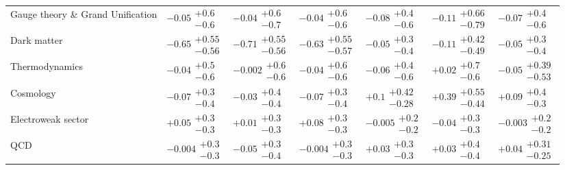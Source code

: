 \begin{table}[H]
\begin{tabular}{lllllll}
Gauge theory \& Grand Unification & $-0.05\substack{+0.6 \\ -0.6}$ & $-0.04\substack{+0.6 \\ -0.7}$ & $-0.04\substack{+0.6 \\ -0.6}$ & $-0.08\substack{+0.4 \\ -0.6}$ & $-0.11\substack{+0.66 \\ -0.79}$ & $-0.07\substack{+0.4 \\ -0.6}$ \\
Dark matter & $\bm{-0.65}\substack{+0.55 \\ -0.56}$ & $\bm{-0.71}\substack{+0.55 \\ -0.56}$ & $\bm{-0.63}\substack{+0.55 \\ -0.57}$ & $-0.05\substack{+0.3 \\ -0.4}$ & $-0.11\substack{+0.42 \\ -0.49}$ & $-0.05\substack{+0.3 \\ -0.4}$ \\
Thermodynamics & $-0.04\substack{+0.5 \\ -0.6}$ & $-0.002\substack{+0.6 \\ -0.6}$ & $-0.04\substack{+0.6 \\ -0.6}$ & $-0.06\substack{+0.4 \\ -0.6}$ & $+0.02\substack{+0.7 \\ -0.6}$ & $-0.05\substack{+0.39 \\ -0.53}$ \\
Cosmology & $-0.07\substack{+0.3 \\ -0.4}$ & $-0.03\substack{+0.4 \\ -0.4}$ & $-0.07\substack{+0.3 \\ -0.4}$ & $+0.1\substack{+0.42 \\ -0.28}$ & $+0.39\substack{+0.55 \\ -0.44}$ & $+0.09\substack{+0.4 \\ -0.3}$ \\
Electroweak sector & $+0.05\substack{+0.3 \\ -0.3}$ & $+0.01\substack{+0.3 \\ -0.3}$ & $+0.08\substack{+0.3 \\ -0.3}$ & $-0.005\substack{+0.2 \\ -0.2}$ & $-0.04\substack{+0.3 \\ -0.3}$ & $-0.003\substack{+0.2 \\ -0.2}$ \\
QCD & $-0.004\substack{+0.3 \\ -0.3}$ & $-0.05\substack{+0.3 \\ -0.4}$ & $-0.004\substack{+0.3 \\ -0.3}$ & $+0.03\substack{+0.3 \\ -0.3}$ & $+0.03\substack{+0.4 \\ -0.4}$ & $+0.04\substack{+0.31 \\ -0.25}$ \\

\end{tabular}
\end{table}
